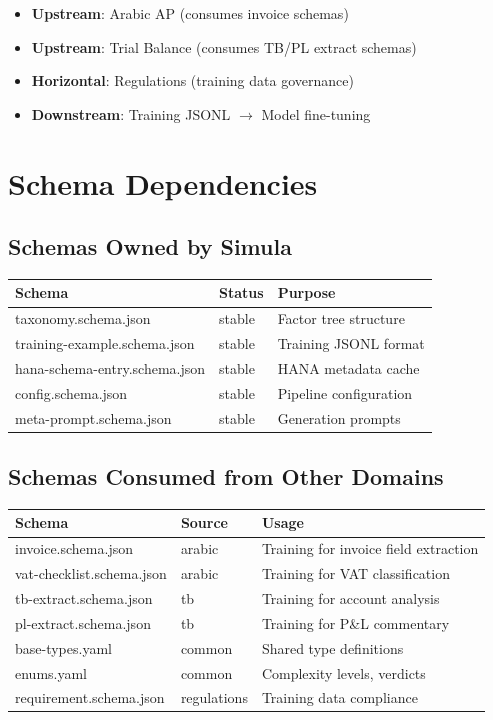 \documentclass[12pt,a4paper,twoside]{report}
\begin{document}
\begin{itemize}
\item \textbf{Upstream}: Arabic AP (consumes invoice schemas)
\item \textbf{Upstream}: Trial Balance (consumes TB/PL extract schemas)
\item \textbf{Horizontal}: Regulations (training data governance)
\item \textbf{Downstream}: Training JSONL $\rightarrow$ Model fine-tuning
\end{itemize}

\section{Schema Dependencies}
\label{sec:schema-deps}

\subsection{Schemas Owned by Simula}

\begin{tabularx}{\linewidth}{@{}l l X@{}}
\toprule
\textbf{Schema} & \textbf{Status} & \textbf{Purpose} \\
\midrule
taxonomy.schema.json & stable & Factor tree structure \\
training-example.schema.json & stable & Training JSONL format \\
hana-schema-entry.schema.json & stable & HANA metadata cache \\
config.schema.json & stable & Pipeline configuration \\
meta-prompt.schema.json & stable & Generation prompts \\
\bottomrule
\end{tabularx}

\subsection{Schemas Consumed from Other Domains}

\begin{tabularx}{\linewidth}{@{}l l X@{}}
\toprule
\textbf{Schema} & \textbf{Source} & \textbf{Usage} \\
\midrule
invoice.schema.json & arabic & Training for invoice field extraction \\
vat-checklist.schema.json & arabic & Training for VAT classification \\
tb-extract.schema.json & tb & Training for account analysis \\
pl-extract.schema.json & tb & Training for P\&L commentary \\
base-types.yaml & common & Shared type definitions \\
enums.yaml & common & Complexity levels, verdicts \\
requirement.schema.json & regulations & Training data compliance \\
\bottomrule
\end{tabularx}
\end{document}

